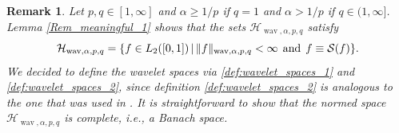 \documentclass[12pt]{article}
\DeclareMathOperator{\wav}{wav}
\newtheorem{remark}{Remark}
\begin{document}
\begin{remark}\label{Rem:RKBS}
Let $p,q\in [1,\infty]$ and $\alpha \ge 1/p$ if $q=1$ and $\alpha>1/p$ if $q\in (1,\infty]$. 
Lemma \ref{Rem_meaningful_1} shows that the sets $\mathcal{H}_{\wav,\alpha,p,q}$ satisfy
\begin{equation}\label{alt_def_Haar_wavelet_space}
 \mathcal{H}_{\wav,\alpha,p,q} =
\{ f\in L_2([0,1]) \,|\,  \|f\|_{\wav,\alpha,p,q} <\infty  \hspace{1ex}\text{and}\hspace{1ex} f \equiv \mathcal{S}(f)\}.
\end{equation}
We decided to define the wavelet spaces via \eqref{def:wavelet_spaces_1} and \eqref{def:wavelet_spaces_2}, since definition \eqref{def:wavelet_spaces_2} is analogous to the one that was used in \cite{Ent97}. It is straightforward to show that the normed space $\mathcal{H}_{\wav,\alpha,p,q}$ is complete, i.e., a Banach space. 
\end{remark}
\end{document}
